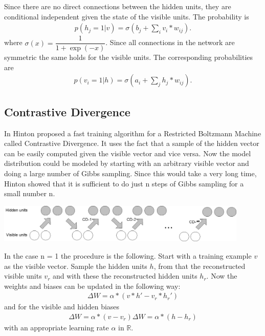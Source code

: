 \documentclass[a4paper]{scrartcl}
\newcommand{\R}{\mathbb{R}}
\begin{document}
Since there are no direct connections between the hidden units, they are conditional independent given the state of the visible units. The probability is
\begin{align}
p(h_j = 1|v) = \sigma(b_j + \sum_i v_i*w_{ij}).
\end{align}
where $\sigma(x) = \dfrac{1}{1+\exp(-x)}$. Since all connections in the network are symmetric the same holds for the visible units. The corresponding probabilities are
\begin{align}
p(v_i = 1|h) = \sigma(a_i + \sum_j h_j*w_{ij}).
\end{align}


\subsection{Contrastive Divergence}
In \cite{Hinton2} Hinton proposed a fast training algorithm for a Restricted Boltzmann Machine called Contrastive Divergence. It uses the fact that a sample of the hidden vector can be easily computed given the visible vector and vice versa. Now the model distribution could be modeled by starting with an arbitrary visible vector and doing a large number of Gibbs sampling. Since this would take a very long time, Hinton showed that it is sufficient to do just n steps of Gibbs sampling for a small number n.
\begin{center}
\includegraphics[width=12cm]{images/cd-n.png}
\end{center}
In the case n = 1 the procedure is the following. Start with a training example $v$ as the visible vector. Sample the hidden units $h$, from that the reconstructed visible units $v_r$ and with these the reconstructed hidden units $h_r$. Now the weights and biases can be updated in the following way:
\begin{align*}
\Delta W = \alpha*(v*h' - v_r*h_r')
\end{align*}
and for the visible and hidden biases
\begin{align*}
\Delta W = \alpha*(v-v_r) \Delta W = \alpha*(h-h_r)
\end{align*}
with an appropriate learning rate $\alpha$ in $\R$.
\end{document}

